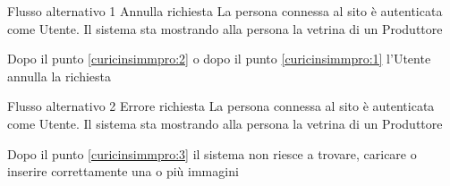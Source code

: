 %
{Flusso alternativo 1}%
{Annulla richiesta}%
{La persona connessa al sito è autenticata come Utente. Il sistema sta mostrando alla persona la vetrina di un Produttore}%
{\postNulle}%
{\begin{enumCU}
		\item Dopo il punto \ref{curicinsimmpro:2} o dopo il punto \ref{curicinsimmpro:1} l'Utente annulla la richiesta
	\end{enumCU}}%
%
{Flusso alternativo 2}%
{Errore richiesta}%
{La persona connessa al sito è autenticata come Utente. Il sistema sta mostrando alla persona la vetrina di un Produttore}%
{\postNulle}%
{\begin{enumCU}
		\item Dopo il punto \ref{curicinsimmpro:3} il sistema non riesce a trovare, caricare o inserire correttamente una o più immagini
	\end{enumCU}}%


